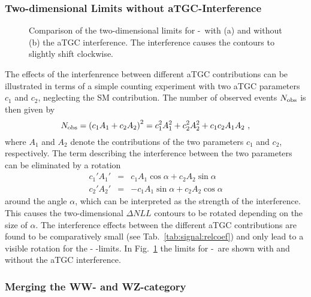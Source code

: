 \subsubsection*{Two-dimensional Limits without aTGC-Interference}
\begin{figure}
	\centering
	\caption[Comparison of the two-dimensional limits for \Tccw -\Tcb \ with and without the aTGC interference]{Comparison of the two-dimensional limits for \Tccw -\Tcb \ with (a) and without (b) the aTGC interference. The interference causes the contours to slightly shift clockwise.}
	\label{fig:limits:noatgcint}
\end{figure}
The effects of the interfenrence between different aTGC contributions can be illustrated in terms of a simple counting experiment with two aTGC parameters $c_1$ and $c_2$, neglecting the SM contribution. The number of observed events $N_{\rm obs}$ is then given by
\begin{equation}
N_{\rm obs} = \left( c_1A_1 + c_2A_2 \right)^2 = c_1^2A_1^2 + c_2^2A_2^2 + c_1c_2A_1A_2 ~,
\end{equation}
where $A_1$ and $A_2$ denote the contributions of the two parameters $c_1$ and $c_2$, respectively. The term describing the interference between the two parameters can be eliminated by a rotation
\begin{eqnarray}
c_1'A_1' &=& c_1A_1\cos \alpha + c_2A_2\sin \alpha \\
c_2'A_2' &=& -c_1A_1\sin \alpha + c_2A_2\cos \alpha
\end{eqnarray}
around the angle $\alpha$, which can be interpreted as the strength of the interference. This causes the two-dimensional $\Delta NLL$ contours to be rotated depending on
the size of $\alpha$. The interference effects between the different aTGC contributions are found to be comparatively small (see Tab.~\ref{tab:signal:relcoef}) and only lead to a visible rotation for the \Tccw - \Tcb -limits. In Fig.~\ref{fig:limits:noatgcint} the limits for \Tccw -\Tcb \ are shown with and without the aTGC interference.


\subsubsection*{Merging the WW- and WZ-category}


